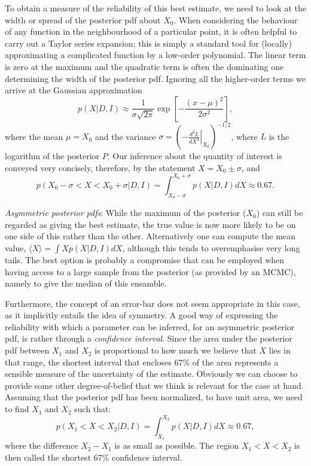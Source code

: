 \documentclass[%
oneside,                 %
final,                   %
10pt]{article}
\begin{document}
To obtain a measure of the reliability of this best estimate, we need to look at the width or spread of the posterior pdf about $X_0$. When considering the behaviour of any function in the neighbourhood of a particular point, it is often helpful to carry out a Taylor series expansion; this is simply a standard tool for (locally) approximating a complicated function by a low-order polynomial. The linear term is zero at the maximum and the quadratic term is often the dominating one determining the width of the posterior pdf. Ignoring all the higher-order terms we arrive at the Gaussian approximation
\begin{equation}
p(X|D,I) \approx \frac{1}{\sigma\sqrt{2\pi}} \exp \left[ -\frac{(x-\mu)^2}{2\sigma^2} \right],
\end{equation}
where the mean $\mu = X_0$ and the variance $\sigma = \left( - \left. \frac{d^2L}{dX^2} \right|_{X_0} \right)^{-1/2}$, where $L$ is the logarithm of the posterior $P$. Our inference about the quantity of interest is conveyed very concisely, therefore, by the statement $X = X_0 \pm \sigma$, and 
\[
p(X_0-\sigma < X < X_0+\sigma | D,I) = \int_{X_0-\sigma}^{X_0+\sigma} p(X|D,I) dX \approx 0.67.
\]

\emph{Asymmetric posterior pdfs}: While the maximum of the posterior ($X_0$) can still be regarded as giving the best estimate, the true value is now more likely to be on one side of this rather than the other. Alternatively one can compute the mean value, $\langle X \rangle = \int X p(X|D,I) dX$, although this tends to overemphasise very long tails. The best option is probably a compromise that can be employed when having access to a large sample from the posterior (as provided by an MCMC), namely to give the median of this ensamble.

Furthermore, the concept of an error-bar does not seem appropriate in this case, as it implicitly entails the idea of symmetry. A good way of expressing the reliability with which a parameter can be inferred, for an asymmetric posterior pdf, is rather through a \emph{confidence interval}. Since the area under the posterior pdf between $X_1$ and $X_2$ is proportional to how much we believe that $X$ lies in that range, the shortest interval that encloses 67\% of the area represents a sensible measure of the uncertainty of the estimate. Obviously we can choose to provide some other degree-of-belief that we think is relevant for the case at hand. Assuming that the posterior pdf has been normalized, to have unit area, we need to find $X_1$ and $X_2$ such that: 
\[
p(X_1 < X < X_2 | D,I) = \int_{X_1}^{X_2} p(X|D,I) dX \approx 0.67, 
\]
where the difference $X_2 - X_1$ is as small as possible. The region $X_1 < X < X_2$ is then called the shortest 67\% confidence interval. 
\end{document}

